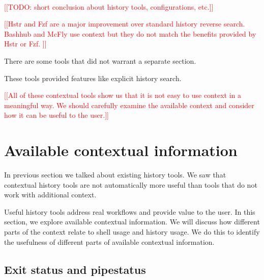 \documentclass[thesis=M,english]{FITthesis}[2012/10/20]
\newcommand{\redtext}[1]{\textcolor{red}{[[#1]]}}
\begin{document}
\paragraph{}

\redtext{TODO: short conclusion about history tools, configurations, etc.}




\redtext{Hstr and Fzf are a major improvement over standard history reverse search. Bashhub and McFly use context but they do not match the benefits provided by Hstr or Fzf. }

There are some tools that did not warrant a separate section. 

These tools provided features like explicit history search.

\redtext{All of these contextual tools show us that it is not easy to use context in a meaningful way. We should carefully examine the available context and consider how it can be useful to the user.}

\section{Available contextual information}


In previous section we talked about existing history tools. We saw that contextual history tools are not automatically more useful than tools that do not work with additional context. 

Useful history tools address real workflows and provide value to the user.
In this section, we explore available contextual information. We will discuss how different parts of the context relate to shell usage and history usage. We do this to identify the usefulness of different parts of available contextual information. 

\subsection{Exit status and pipestatus}
\end{document}
